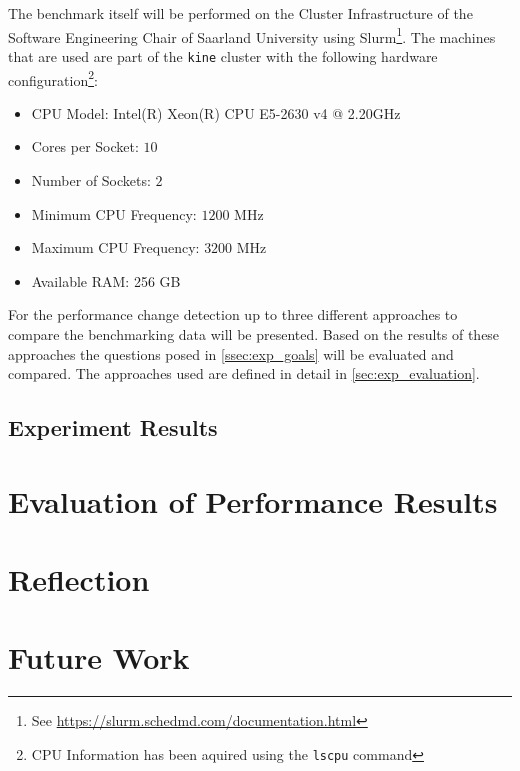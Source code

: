 \documentclass[	runningheads,
				a4paper]{llncs}
\begin{document}
The benchmark itself will be performed on the Cluster Infrastructure of the Software Engineering Chair of Saarland University using Slurm\footnote{See \url{https://slurm.schedmd.com/documentation.html}}. The machines that are used are part of the \texttt{kine} cluster with the following hardware configuration\footnote{CPU Information has been aquired using the \texttt{lscpu} command}:

\begin{itemize}
	\item CPU Model: Intel(R) Xeon(R) CPU E5-2630 v4 @ 2.20GHz
	\item Cores per Socket: $10$
	\item Number of Sockets: $2$
	\item Minimum CPU Frequency: $1200$ MHz
	\item Maximum CPU Frequency: $3200$ MHz
	\item Available RAM: 256 GB
\end{itemize}

For the performance change detection up to three different approaches to compare the benchmarking data will be presented. Based on the results of these approaches the questions posed in \autoref{ssec:exp_goals} will be evaluated and compared. The approaches used are defined in detail in \autoref{sec:exp_evaluation}.

	\subsection{Experiment Results}

\section{Evaluation of Performance Results}
\label{sec:exp_evaluation}
\section{Reflection}

\section{Future Work}
	
	
	
	
	
\end{document}
